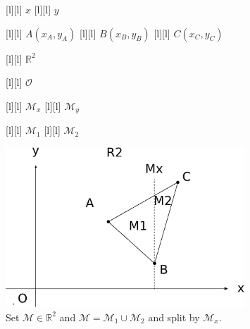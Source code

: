 \begin{figure}[ht]
	\centering
	\footnotesize

	[l] {$x$}
	[l] {$y$}

	[l] {$A(x_A,y_A)$}
	[l] {$B(x_B,y_B)$}
	[l] {$C(x_C,y_C)$}

	[l] {$\mathbb{R}^2$}

	[l] {$\mathcal{O}$}

	[l] {$\mathcal{M}_x$}
	[l] {$\mathcal{M}_y$}

	[l] {$\mathcal{M}_1$}
	[l] {$\mathcal{M}_2$}

	\includegraphics[width=0.8\textwidth]{setAinR2_Ax.eps}
	\caption{Set $\mathcal{M} \in \mathbb{R}^2$ and 
	$\mathcal{M} = \mathcal{M}_{1} \cup \mathcal{M}_{2}$
		and split by $\mathcal{M}_x$.}
	\label{\LABEL}
\end{figure}
